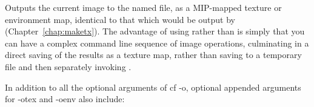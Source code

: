\apiend

\label{sec:oiiotool:otex}

Outputs the current image to the named file, as a MIP-mapped texture or
environment map, identical to that which would be output by \maketx
(Chapter~\ref{chap:maketx}). The advantage of using \oiiotool rather than
\maketx is simply that you can have a complex \oiiotool command line
sequence of image operations, culminating in a direct saving of the results
as a texture map, rather than saving to a temporary file and then separately
invoking \maketx.

\noindent In addition to all the optional arguments of {cf -o}, optional
appended arguments for {\cf -otex} and {\cf -oenv} also include:

\smallskip

